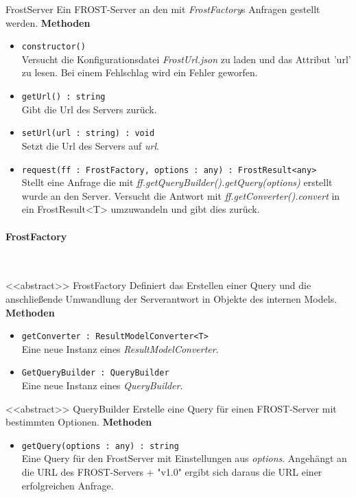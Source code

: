 \begin{Class}{FrostServer}
    Ein FROST-Server an den mit \emph{FrostFactory}s Anfragen gestellt werden.
    \textbf{Methoden}
    \begin{itemize}
        \item \texttt{constructor()}
        \\ Versucht die Konfigurationsdatei \emph{FrostUrl.json} zu laden und das Attribut 'url' zu lesen.
        Bei einem Fehlschlag wird ein Fehler geworfen.
        \item \texttt{getUrl() : string}
        \\ Gibt die Url des Servers zurück.
        \item \texttt{setUrl(url : string) : void}
        \\ Setzt die Url des Servers auf \emph{url}.
        \item \texttt{request(ff : FrostFactory, options : any) : FrostResult<any>}
        \\ Stellt eine Anfrage die mit \emph{ff.getQueryBuilder().getQuery(options)} erstellt wurde an den Server.
        Versucht die Antwort mit \emph{ff.getConverter().convert} in ein FrostResult<T> umzuwandeln und gibt dies zurück.
    \end{itemize}
\end{Class}

\paragraph{FrostFactory}\mbox{}\\

\begin{Class}{<<abstract>> FrostFactory}
    Definiert das Erstellen einer Query und die anschließende Umwandlung der Serverantwort in Objekte des internen Models.
    \textbf{Methoden}
    \begin{itemize}
        \item \texttt{getConverter : ResultModelConverter<T>}
        \\ Eine neue Instanz eines \emph{ResultModelConverter}.
        \item \texttt{GetQueryBuilder : QueryBuilder}
        \\ Eine neue Instanz eines \emph{QueryBuilder}.
    \end{itemize}
\end{Class}

\begin{Class}{<<abstract>> QueryBuilder}
    Erstelle eine Query für einen FROST-Server mit bestimmten Optionen.
    \textbf{Methoden}
    \begin{itemize}
        \item \texttt{getQuery(options : any) : string}
        \\ Eine Query für den FrostServer mit Einstellungen aus \emph{options}.
        Angehängt an die URL des FROST-Servers + "v1.0" ergibt sich daraus die URL einer erfolgreichen Anfrage.
    \end{itemize}
\end{Class}

